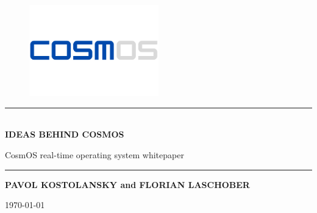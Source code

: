 \begin{titlepage}
    \begin{center}
 
        \begin{figure}[H]
		\begin{center}
		\includegraphics[width=0.5\textwidth]{images/cosmosWhite.png}
		\end{center}
		\end{figure}
		
		\rule{9.8cm}{0.4pt}\\
        \Large
        \textbf{IDEAS BEHIND COSMOS} \\
        
        \vspace{0.25cm}
        
  		\normalsize
        CosmOS real-time operating system whitepaper\\
        \rule{9.8cm}{0.4pt}
        \vspace{1cm}        
        
        \textbf{PAVOL KOSTOLANSKY and FLORIAN LASCHOBER}\\
        
        
        \vspace*{\fill}
        \normalsize
        
        \monthdayyeardate\today
        
    \end{center}


    
\end{titlepage}